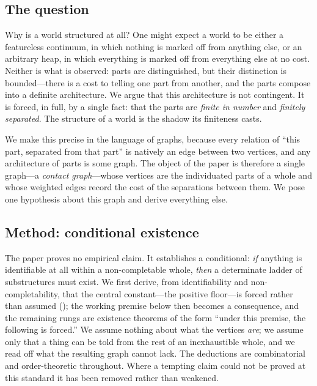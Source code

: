 \documentclass[11pt,a4paper]{article}
\theoremstyle{thmstyle}
\theoremstyle{definition}
\theoremstyle{remark}
\begin{document}
\subsection{The question}

Why is a world structured at all? One might expect a world to be either a
featureless continuum, in which nothing is marked off from anything else, or an
arbitrary heap, in which everything is marked off from everything else at no
cost. Neither is what is observed: parts are distinguished, but their
distinction is bounded---there is a cost to telling one part from another, and
the parts compose into a definite architecture. We argue that this architecture
is not contingent. It is forced, in full, by a single fact: that the parts are
\emph{finite in number} and \emph{finitely separated}. The structure of a world
is the shadow its finiteness casts.

We make this precise in the language of graphs, because every relation of
``this part, separated from that part'' is natively an edge between two
vertices, and any architecture of parts is some graph. The object of the paper
is therefore a single graph---a \emph{contact graph}---whose vertices are the
individuated parts of a whole and whose weighted edges record the cost of the
separations between them. We pose one hypothesis about this graph and derive
everything else.

\subsection{Method: conditional existence}

The paper proves no empirical claim. It establishes a conditional: \emph{if}
anything is identifiable at all within a non-completable whole, \emph{then} a
determinate ladder of substructures must exist. We first derive, from
identifiability and non-completability, that the central constant---the positive
floor---is forced rather than assumed (); the working premise
below then becomes a consequence, and the remaining rungs are existence theorems
of the form ``under this premise, the following is forced.'' We assume nothing
about what the vertices \emph{are}; we assume only that a thing can be told from
the rest of an inexhaustible whole, and we read off what the resulting graph
cannot lack. The deductions are combinatorial and order-theoretic throughout.
Where a tempting claim could not be proved at this standard it has been removed
rather than weakened.
\end{document}
